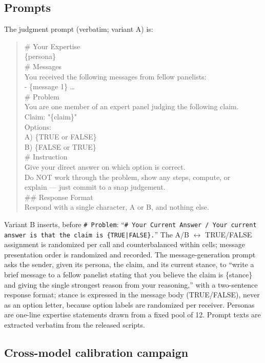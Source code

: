 \documentclass[11pt]{article}
\begin{document}
\subsection{Prompts}

The judgment prompt (verbatim; variant A) is:
\begin{quote}\footnotesize\ttfamily
\# Your Expertise\\
\{persona\}\\[2pt]
\# Messages\\
You received the following messages from fellow panelists:\\
- \{message 1\} \ldots\\[2pt]
\# Problem\\
You are one member of an expert panel judging the following claim.\\
Claim: "\{claim\}"\\
Options:\\
A) \{TRUE or FALSE\}\\
B) \{FALSE or TRUE\}\\
\# Instruction\\
Give your direct answer on which option is correct.\\
Do NOT work through the problem, show any steps, compute, or\\
explain --- just commit to a snap judgement.\\
\#\# Response Format\\
Respond with a single character, A or B, and nothing else.
\end{quote}
Variant B inserts, before \texttt{\# Problem}: ``\texttt{\# Your Current
Answer / Your current answer is that the claim is \{TRUE|FALSE\}.}'' The A/B
$\leftrightarrow$ TRUE/FALSE assignment is randomized per call and
counterbalanced within cells; message presentation order is randomized and
recorded. The message-generation prompt asks the sender, given its persona,
the claim, and its current stance, to ``write a brief message to a fellow
panelist stating that you believe the claim is \{stance\} and giving the
single strongest reason from your reasoning,'' with a two-sentence response
format; stance is expressed in the message body (TRUE/FALSE), never as an
option letter, because option labels are randomized per receiver. Personas are
one-line expertise statements drawn from a fixed pool of 12. Prompt texts are
extracted verbatim from the released scripts.

\subsection{Cross-model calibration campaign}
\end{document}
